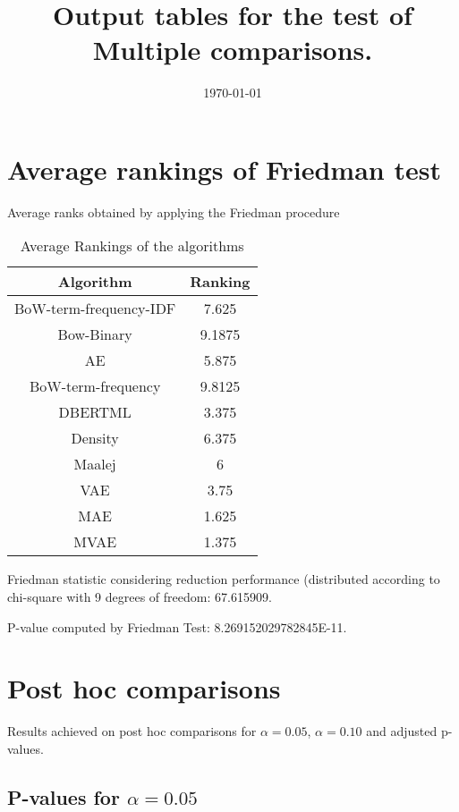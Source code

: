 \documentclass[a4paper,10pt]{article}
\title{Output tables for the test of Multiple comparisons.}
\author{}
\date{\today}
\begin{document}
\begin{landscape}
\pagestyle{empty}
\maketitle
\thispagestyle{empty}
\section{Average rankings of Friedman test}



Average ranks obtained by applying the Friedman procedure

\begin{table}[!htp]
\centering
\begin{tabular}{|c|c|}\hline
Algorithm&Ranking\\\hline
BoW-term-frequency-IDF & 7.625\\
Bow-Binary & 9.1875\\
AE & 5.875\\
BoW-term-frequency & 9.8125\\
DBERTML & 3.375\\
Density & 6.375\\
Maalej & 6\\
VAE & 3.75\\
MAE & 1.625\\
MVAE & 1.375\\
\hline
\end{tabular}
\caption{Average Rankings of the algorithms}
\end{table}

Friedman statistic considering reduction performance (distributed according to chi-square with 9 degrees of freedom: 67.615909.

P-value computed by Friedman Test: 8.269152029782845E-11.\newline



\pagebreak

\section{Post hoc comparisons}

Results achieved on post hoc comparisons for $\alpha = 0.05$, $\alpha = 0.10$ and adjusted p-values.

\subsection{P-values for $\alpha=0.05$}


\end{landscape}
\end{document}
